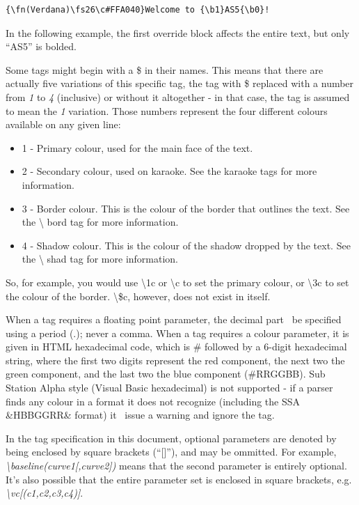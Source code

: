 \documentclass{spec}
\begin{document}
\begin{verbatim}
{\fn(Verdana)\fs26\c#FFA040}Welcome to {\b1}AS5{\b0}!
\end{verbatim}

In the following example, the first override block affects the entire text, but only ``AS5'' is bolded.

Some tags might begin with a \$ in their names. This means that there are actually five variations
of this specific tag, the tag with \$ replaced with a number from \emph{1} to \emph{4} (inclusive)
or without it altogether - in that case, the tag is assumed to mean the \emph{1} variation. Those
numbers represent the four different colours available on any given line:

\begin{itemize}
\item 1 - Primary colour, used for the main face of the text.
\item 2 - Secondary colour, used on karaoke. See the karaoke tags for more information.
\item 3 - Border colour. This is the colour of the border that outlines the text. See the \textbackslash
bord tag for more information.
\item 4 - Shadow colour. This is the colour of the shadow dropped by the text. See the \textbackslash
shad tag for more information.
\end{itemize}

So, for example, you would use \textbackslash 1c or \textbackslash c to set the primary colour, or
\textbackslash 3c to set the colour of the border. \textbackslash \$c, however, does not exist in
itself.

When a tag requires a floating point parameter, the decimal part \must\ be specified using a period (.);
never a comma. When a tag requires a colour parameter, it is given in HTML hexadecimal code, which is
\# followed by a 6-digit hexadecimal string, where the first two digits represent the red component,
the next two the green component, and the last two the blue component (\#RRGGBB). Sub Station Alpha
style (Visual Basic hexadecimal) is not supported - if a parser finds any colour in a format it does
not recognize (including the SSA \&HBBGGRR\& format) it \must\ issue a warning and ignore the tag.

In the tag specification in this document, optional parameters are denoted by being enclosed by square
brackets (``[]''), and may be ommitted. For example, \emph{\textbackslash baseline(curve1[,curve2])}
means that the second parameter is entirely optional. It's also possible that the entire parameter set
is enclosed in square brackets, e.g. \emph{\textbackslash vc[(c1,c2,c3,c4)]}.
\end{document}
